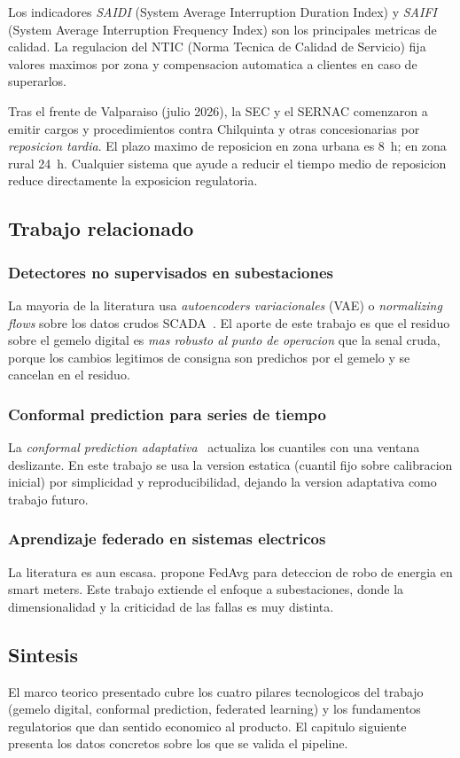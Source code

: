 Los indicadores \emph{SAIDI} (System Average Interruption Duration
Index) y \emph{SAIFI} (System Average Interruption Frequency Index)
son los principales metricas de calidad. La regulacion del NTIC
(Norma Tecnica de Calidad de Servicio) fija valores maximos por zona
y compensacion automatica a clientes en caso de superarlos.

Tras el frente de Valparaiso (julio 2026), la SEC y el SERNAC
comenzaron a emitir cargos y procedimientos contra Chilquinta y otras
concesionarias por \emph{reposicion tardia}. El plazo maximo de
reposicion en zona urbana es 8~h; en zona rural 24~h. Cualquier
sistema que ayude a reducir el tiempo medio de reposicion reduce
directamente la exposicion regulatoria.

\subsection{Trabajo relacionado}

\subsubsection{Detectores no supervisados en subestaciones}

La mayoria de la literatura usa \emph{autoencoders variacionales} (VAE)
o \emph{normalizing flows} sobre los datos crudos SCADA~\citep{AE-IEA-2021}.
El aporte de este trabajo es que el residuo sobre el gemelo digital es
\emph{mas robusto al punto de operacion} que la senal cruda, porque
los cambios legitimos de consigna son predichos por el gemelo y se
cancelan en el residuo.

\subsubsection{Conformal prediction para series de tiempo}

La \emph{conformal prediction adaptativa}~\citep{ACI-2020} actualiza
los cuantiles con una ventana deslizante. En este trabajo se usa la
version estatica (cuantil fijo sobre calibracion inicial) por
simplicidad y reproducibilidad, dejando la version adaptativa como
trabajo futuro.

\subsubsection{Aprendizaje federado en sistemas electricos}

La literatura es aun escasa. \citet{FedGrid-2022} propone FedAvg
para deteccion de robo de energia en smart meters. Este trabajo
extiende el enfoque a subestaciones, donde la dimensionalidad y la
criticidad de las fallas es muy distinta.

\subsection{Sintesis}

El marco teorico presentado cubre los cuatro pilares tecnologicos del
trabajo (gemelo digital, conformal prediction, federated learning) y los
fundamentos regulatorios que dan sentido economico al producto. El
capitulo siguiente presenta los datos concretos sobre los que se
valida el pipeline.